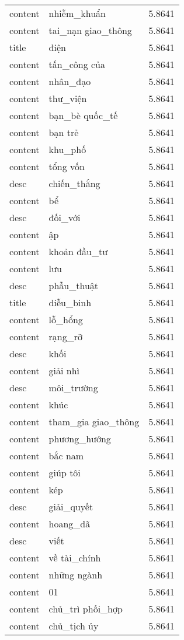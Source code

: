 \documentclass{article}
\begin{document}
\begin{tabular}{lll}
content & nhiễm\_khuẩn & 5.8641\\
content & tai\_nạn giao\_thông & 5.8641\\
title & điện & 5.8641\\
content & tấn\_công của & 5.8641\\
content & nhân\_đạo & 5.8641\\
content & thư\_viện & 5.8641\\
content & bạn\_bè quốc\_tế & 5.8641\\
content & bạn trẻ & 5.8641\\
content & khu\_phố & 5.8641\\
content & tổng vốn & 5.8641\\
desc & chiến\_thắng & 5.8641\\
content & bể & 5.8641\\
desc & đối\_với & 5.8641\\
content & ập & 5.8641\\
content & khoản đầu\_tư & 5.8641\\
content & lưu & 5.8641\\
desc & phẫu\_thuật & 5.8641\\
title & diễu\_binh & 5.8641\\
content & lỗ\_hổng & 5.8641\\
content & rạng\_rỡ & 5.8641\\
desc & khối & 5.8641\\
content & giải nhì & 5.8641\\
desc & môi\_trường & 5.8641\\
content & khúc & 5.8641\\
content & tham\_gia giao\_thông & 5.8641\\
content & phương\_hướng & 5.8641\\
content & bắc nam & 5.8641\\
content & giúp tôi & 5.8641\\
content & kép & 5.8641\\
desc & giải\_quyết & 5.8641\\
content & hoang\_dã & 5.8641\\
desc & viết & 5.8641\\
content & về tài\_chính & 5.8641\\
content & những ngành & 5.8641\\
content & 01 & 5.8641\\
content & chủ\_trì phối\_hợp & 5.8641\\
content & chủ\_tịch ủy & 5.8641\\

\end{tabular}
\end{document}
